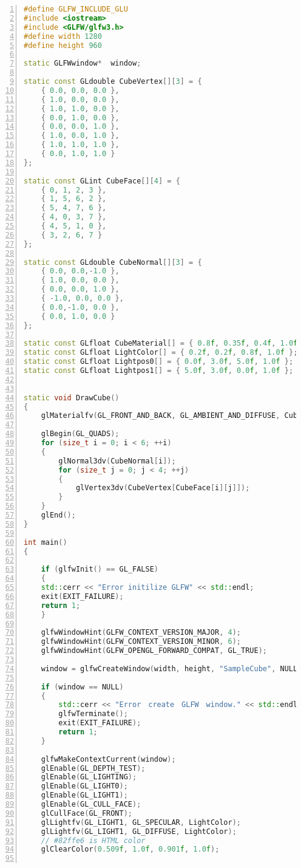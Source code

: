 \documentclass[a4paper,titlepage]{jsarticle}
\begin{document}
\begin{lstlisting}[language=C++,numbers = left]
#define GLFW_INCLUDE_GLU
#include <iostream>
#include <GLFW/glfw3.h>
#define width 1280
#define height 960

static GLFWwindow*  window;

static const GLdouble CubeVertex[][3] = {
	{ 0.0, 0.0, 0.0 },
	{ 1.0, 0.0, 0.0 },
	{ 1.0, 1.0, 0.0 },
	{ 0.0, 1.0, 0.0 },
	{ 0.0, 0.0, 1.0 },
	{ 1.0, 0.0, 1.0 },
	{ 1.0, 1.0, 1.0 },
	{ 0.0, 1.0, 1.0 }
};

static const GLint CubeFace[][4] = {
	{ 0, 1, 2, 3 },
	{ 1, 5, 6, 2 },
	{ 5, 4, 7, 6 },
	{ 4, 0, 3, 7 },
	{ 4, 5, 1, 0 },
	{ 3, 2, 6, 7 }
};

static const GLdouble CubeNormal[][3] = {
	{ 0.0, 0.0,-1.0 },
	{ 1.0, 0.0, 0.0 },
	{ 0.0, 0.0, 1.0 },
	{ -1.0, 0.0, 0.0 },
	{ 0.0,-1.0, 0.0 },
	{ 0.0, 1.0, 0.0 }
};

static const GLfloat CubeMaterial[] = { 0.8f, 0.35f, 0.4f, 1.0f };
static const GLfloat LightColor[] = { 0.2f, 0.2f, 0.8f, 1.0f };
static const GLfloat Lightpos0[] = { 0.0f, 3.0f, 5.0f, 1.0f };
static const GLfloat Lightpos1[] = { 5.0f, 3.0f, 0.0f, 1.0f };


static void DrawCube()
{
	glMaterialfv(GL_FRONT_AND_BACK, GL_AMBIENT_AND_DIFFUSE, CubeMaterial);

	glBegin(GL_QUADS);
	for (size_t i = 0; i < 6; ++i)
	{
		glNormal3dv(CubeNormal[i]);
		for (size_t j = 0; j < 4; ++j)
		{
			glVertex3dv(CubeVertex[CubeFace[i][j]]);
		}
	}
	glEnd();
}

int main()
{

	if (glfwInit() == GL_FALSE)
	{
	std::cerr << "Error initilize GLFW" << std::endl;
	exit(EXIT_FAILURE);
	return 1;
	}
	
	glfwWindowHint(GLFW_CONTEXT_VERSION_MAJOR, 4);
	glfwWindowHint(GLFW_CONTEXT_VERSION_MINOR, 6);
	glfwWindowHint(GLFW_OPENGL_FORWARD_COMPAT, GL_TRUE);

	window = glfwCreateWindow(width, height, "SampleCube", NULL, NULL);

	if (window == NULL)
	{
		std::cerr << "Error　create　GLFW　window." << std::endl;
		glfwTerminate();
		exit(EXIT_FAILURE);
		return 1;
	}

	glfwMakeContextCurrent(window);
	glEnable(GL_DEPTH_TEST);
	glEnable(GL_LIGHTING);
	glEnable(GL_LIGHT0);
	glEnable(GL_LIGHT1);
	glEnable(GL_CULL_FACE);
	glCullFace(GL_FRONT);
	glLightfv(GL_LIGHT1, GL_SPECULAR, LightColor);
	glLightfv(GL_LIGHT1, GL_DIFFUSE, LightColor);
	// #82ffe6 is HTML color
	glClearColor(0.509f, 1.0f, 0.901f, 1.0f);


\end{lstlisting}
\end{document}
